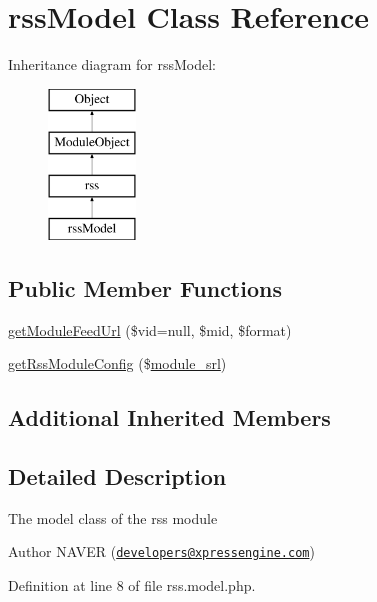\hypertarget{classrssModel}{}\section{rss\+Model Class Reference}
\label{classrssModel}
Inheritance diagram for rss\+Model\+:\begin{figure}[H]
\begin{center}
\leavevmode
\includegraphics[height=4.000000cm]{classrssModel}
\end{center}
\end{figure}
\subsection*{Public Member Functions}
\begin{DoxyCompactItemize}
\item 
\hyperlink{classrssModel_afaab782e467091fb51103d386682bca8}{get\+Module\+Feed\+Url} (\$vid=null, \$mid, \$format)
\item 
\hyperlink{classrssModel_a3c6f9fd398a931ff32038e2a48745bad}{get\+Rss\+Module\+Config} (\$\hyperlink{ko_8install_8php_a370bb6450fab1da3e0ed9f484a38b761}{module\+\_\+srl})
\end{DoxyCompactItemize}
\subsection*{Additional Inherited Members}


\subsection{Detailed Description}
The model class of the rss module

\begin{DoxyAuthor}{Author}
N\+A\+V\+E\+R (\href{mailto:developers@xpressengine.com}{\tt developers@xpressengine.\+com}) 
\end{DoxyAuthor}


Definition at line 8 of file rss.\+model.\+php.



